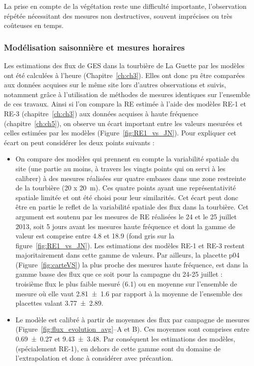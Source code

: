 La prise en compte de la végétation reste une difficulté importante, l'observation répétée nécessitant des mesures non destructives, souvent imprécises ou très coûteuses en temps.


\subsubsection*{Modélisation saisonnière et mesures horaires}

Les estimations des flux de GES dans la tourbière de La Guette par les modèles ont été calculées à l'heure (Chapitre~\ref{ch:ch3}).
Elles ont donc pu être comparées aux données acquises sur le même site lors d'autres observations et suivis, notamment grâce à l'utilisation de méthodes de mesures identiques sur l'ensemble de ces travaux.
Ainsi si l'on compare la RE estimée à l'aide des modèles RE-1 et RE-3 (chapitre~\ref{ch:ch3}) aux données acquises à haute fréquence (chapitre~\ref{ch:ch5}), on observe un écart important entre les valeurs mesurées et celles estimées par les modèles (Figure~\ref{fig:RE1_vs_JN}).
Pour expliquer cet écart on peut considérer les deux points suivants : 

\begin{itemize}
\item On compare des modèles qui prennent en compte la variabilité spatiale du site (une partie au moins, à travers les vingts points qui on servi à les calibrer) à des mesures réalisées sur quatre embases dans une zone restreinte de la tourbière (20 x \SI{20}{\metre}).
Ces quatre points ayant une représentativité spatiale limitée et ont été choisi pour leur similarités.
Cet écart peut donc être en partie le reflet de la variabilité spatiale des flux dans la tourbière.
Cet argument est soutenu par les mesures de RE réalisées le 24 et le 25 juillet 2013, soit 5 jours avant les mesures haute fréquence et dont la gamme de valeur est comprise entre \num{4.8} et \SI{18.9}{\uml} (fond gris sur la figure~\ref{fig:RE1_vs_JN}).
Les estimations des modèles RE-1 et RE-3 restent majoritairement dans cette gamme de valeurs.
Par ailleurs, la placette p04 (Figure~\ref{fig:carteVS}) la plus proche des mesures haute fréquence, est dans la gamme basse des flux que ce soit pour la campagne du 24-25 juillet : troisième flux le plus faible mesuré (\SI{6.1}{\uml}) ou en moyenne sur l'ensemble de mesure où elle vaut \SI{2.81(160)}{\uml} par rapport à la moyenne de l'ensemble des placettes valant \SI{3.77(289)}{\uml}.
\item Le modèle est calibré à partir de moyennes des flux par campagne de mesures (Figure~\ref{fig:flux_evolution_avg}--A et B).
Ces moyennes sont comprises entre \num{0.69(027)} et \SI{9.43(348)}{\uml}.
Par conséquent les estimations des modèles, (spécialement RE-1), en dehors de cette gamme sont du domaine de l'extrapolation et donc à considérer avec précaution.
\end{itemize}

